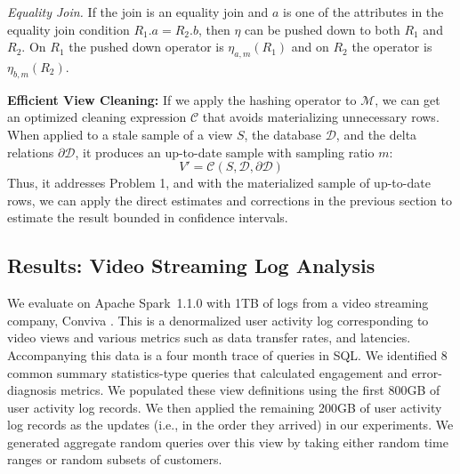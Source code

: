 \emph{Equality Join. } If the join is an equality join and $a$ is one of the attributes in the equality join condition $R_1.a = R_2.b$, then $\eta$ can be pushed down to both $R_1$ and $R_2$. On $R_1$ the pushed down operator is $\eta_{a, m}(R_1)$ and on $R_2$ the operator is $\eta_{b, m}(R_2)$.

\vspace{0.5em} 

\noindent \textbf{Efficient View Cleaning: }
If we apply the hashing operator to $\mathcal{M}$, we can get an optimized cleaning expression $\mathcal{C}$ that avoids materializing unnecessary rows. 
When applied to a stale sample of a view $S$, the database $\mathcal{D}$, and the delta relations $\partial \mathcal{D}$, it produces an up-to-date sample with sampling ratio $m$:
\[
V' = \mathcal{C}(S,\mathcal{D},\partial \mathcal{D})
\]
Thus, it addresses Problem 1, and with the materialized sample of up-to-date rows, we can apply the direct estimates and corrections in the previous section to estimate the result bounded in confidence intervals.

\subsection{Results: Video Streaming Log Analysis}
We evaluate \svc on Apache Spark~1.1.0 with 1TB of logs from a video streaming company, Conviva \cite{conviva}.
This is a denormalized user activity log corresponding to video views and various metrics such as data transfer rates, and latencies.
Accompanying this data is a four month trace of queries in SQL.
We identified 8 common summary statistics-type queries that calculated engagement and error-diagnosis metrics.
We populated these view definitions using the first 800GB of user activity log records.  
We then applied the remaining 200GB of user activity log records as the updates (i.e., in the order they arrived) in our experiments.
We generated aggregate random queries over this view by taking either random time ranges or random subsets of customers.

